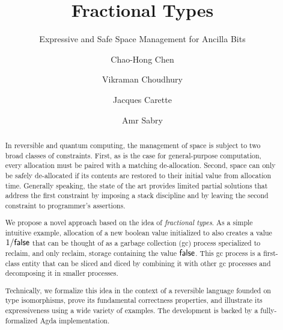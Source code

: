 \documentclass[sigplan,10pt,review,anonymous]{acmart}
\newcommand{\oneover}[1]{1/#1}
\begin{document}
\title{Fractional Types}
\subtitle{Expressive and Safe Space Management for Ancilla Bits}
\author{Chao-Hong Chen}

\author{Vikraman Choudhury}

\author{Jacques Carette}

\author{Amr Sabry}

\begin{abstract}
  In reversible and quantum computing, the management of space is
  subject to two broad classes of constraints. First, as is the case
  for general-purpose computation, every allocation must be paired
  with a matching de-allocation. Second, space can only be safely
  de-allocated if its contents are restored to their initial value
  from allocation time. Generally speaking, the state of the art
  provides limited partial solutions that address the first
  constraint by imposing a stack discipline and by leaving the second
  constraint to programmer's assertions.

  We propose a novel approach based on the idea of \emph{fractional
    types}. As a simple intuitive example, allocation of a new boolean
  value initialized to  also creates a value
  $\oneover{\AgdaInductiveConstructor{false}}$ that can be thought of as a garbage
  collection (gc) process specialized to reclaim, and only reclaim,
  storage containing the value $\AgdaInductiveConstructor{false}$. This gc process is a
  first-class entity that can be sliced and diced by combining it with
  other gc processes and decomposing it in smaller
  processes.

  Technically, we formalize this idea in the context of a reversible
  language founded on type isomorphisms, prove its fundamental
  correctness properties, and illustrate its expressiveness using a
  wide variety of examples. The development is backed by a
  fully-formalized Agda implementation.
\end{abstract}

\maketitle






\end{document}
